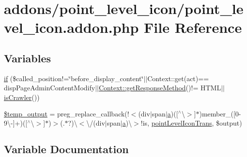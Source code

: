 \hypertarget{point__level__icon_8addon_8php}{}\section{addons/point\+\_\+level\+\_\+icon/point\+\_\+level\+\_\+icon.addon.\+php File Reference}
\label{point__level__icon_8addon_8php}
\subsection*{Variables}
\begin{DoxyCompactItemize}
\item 
\hyperlink{point__level__icon_8addon_8php_a29031816e50a8f742422e671b2bef9b2}{if} (\$called\+\_\+position!=\char`\"{}before\+\_\+display\+\_\+content\char`\"{}$\vert$$\vert$Context\+::get(\textquotesingle{}act\textquotesingle{})== \textquotesingle{}disp\+Page\+Admin\+Content\+Modify\textquotesingle{}$\vert$$\vert$\hyperlink{classContext_a1d02a15209360034cd719d8b08cb5061}{Context\+::get\+Response\+Method}()!= \textquotesingle{}H\+T\+ML\textquotesingle{}$\vert$$\vert$\hyperlink{func_8inc_8php_a490ffbd4821da1995c76c381553d5b3d}{is\+Crawler}())
\item 
\hyperlink{point__level__icon_8addon_8php_a5866ef6f77cbeaf87d8208cf805bbc3d}{\$temp\+\_\+output} = preg\+\_\+replace\+\_\+callback(\textquotesingle{}!$<$(div$\vert$span$\vert$\hyperlink{jqplot_8barRenderer_8min_8js_a15f14caa0c9de3a415d8eb9d88378fc0}{a})(\mbox{[}$^\wedge$\textbackslash{}$>$\mbox{]}$\ast$)member\+\_\+(\mbox{[}0-\/9\textbackslash{}-\/\mbox{]}+)(\mbox{[}$^\wedge$\textbackslash{}$>$\mbox{]}$\ast$)$>$(.$\ast$?)\textbackslash{}$<$\textbackslash{}/(div$\vert$span$\vert$\hyperlink{jqplot_8barRenderer_8min_8js_a15f14caa0c9de3a415d8eb9d88378fc0}{a})\textbackslash{}$>$!is\textquotesingle{}, \textquotesingle{}\hyperlink{point__level__icon_8lib_8php_a6581bcaf11de4c31924e7a5de3d6887d}{point\+Level\+Icon\+Trans}\textquotesingle{}, \$output)
\end{DoxyCompactItemize}


\subsection{Variable Documentation}
